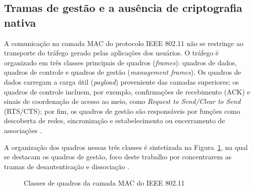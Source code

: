 \subsection{Tramas de gestão e a ausência de criptografia nativa}

A comunicação na camada MAC do protocolo IEEE 802.11 não se restringe ao transporte do tráfego gerado pelas aplicações dos usuários. O tráfego é organizado em três classes principais de quadros (\textit{frames}): quadros de dados, quadros de controle e quadros de gestão (\textit{management frames}). Os quadros de dados carregam a carga útil (\textit{payload}) proveniente das camadas superiores; os quadros de controle incluem, por exemplo, confirmações de recebimento (ACK) e sinais de coordenação de acesso ao meio, como \textit{Request to Send/Clear to Send} (RTS/CTS); por fim, os quadros de gestão são responsáveis por funções como descoberta de redes, sincronização e estabelecimento ou encerramento de associações \cite{Amoordon2022}.

A organização dos quadros nessas três classes é sintetizada na Figura~\ref{fig:classes_quadros}, na qual se destacam os quadros de gestão, foco deste trabalho por concentrarem as tramas de desautenticação e dissociação \cite{Amoordon2022,KohliosHayajneh2018}.

\begin{figure}[htb]
\centering
\caption{Classes de quadros da camada MAC do IEEE 802.11}
\label{fig:classes_quadros}
\end{figure}

